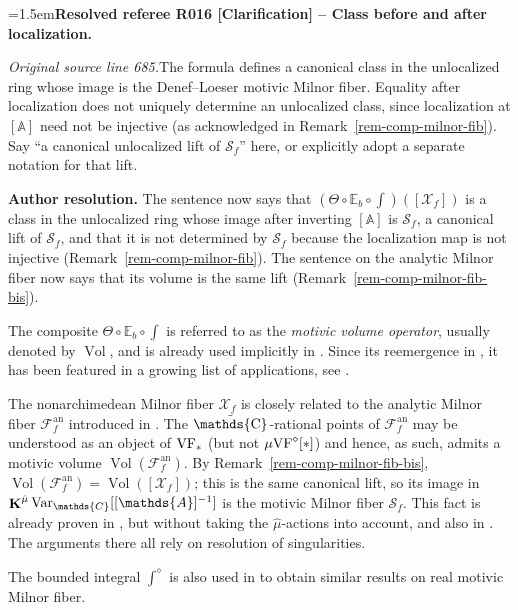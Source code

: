 \documentclass[12pt]{amsart}
\newcommand{\ResolvedRefereeRemark}[5]{%
  \par\medskip\begingroup\normalfont\small\color{gray}%
  \emergencystretch=1.5em\noindent\textbf{Resolved referee R#1 [#2] -- #3.}\par\nobreak\noindent #4\par
  \medskip\color{ResolutionGreen}\noindent\textbf{Author resolution.} #5\par
  \endgroup\medskip
}
\newcommand{\memph}[1]{{\color{magenta}\emph{#1}}}
\theoremstyle{plain}
\theoremstyle{definition}
\theoremstyle{remark}
\numberwithin{equation}{section}
\theoremstyle{plain}
\newcommand{\VF}{\textup{VF}}
\newcommand{\A}{\mathds{A}}
\newcommand{\C}{\mathds{C}}
\newcommand{\0}{\emptyset}
\newcommand{\mdl}[1]{\mathcal{#1}}  %
\newcommand{\bb}[1]{\mathbb{#1}}
\newcommand{\mgVF}{{\mu} {\VF}}
\DeclareMathOperator{\ggk}{\mathbf{K}}
\newcommand{\var}{\textup{Var}}
\DeclareMathOperator{\puC}{\tilde \C}
\DeclareMathOperator{\Vol}{Vol}
\newcommand{\gmv}{\ggk^{\hat \mu}\var_{\C}}
\begin{document}
\ResolvedRefereeRemark{016}{Clarification}{Class before and after localization}{%
\textit{Original source line 685.}\quad The formula defines a canonical class in the unlocalized ring whose image is the Denef--Loeser motivic Milnor fiber. Equality after localization does not uniquely determine an unlocalized class, since localization at $[\A]$ need not be injective (as acknowledged in Remark~\ref{rem-comp-milnor-fib}). Say ``a canonical unlocalized lift of $\mathscr S_f$'' here, or explicitly adopt a separate notation for that lift.
}{The sentence now says that $(\Theta \circ \bb E_b \circ \int)([\mdl X_f])$ is a class in the unlocalized ring whose image after inverting $[\A]$ is $\mathscr S_f$, a canonical lift of $\mathscr S_f$, and that it is not determined by $\mathscr S_f$ because the localization map is not injective (Remark~\ref{rem-comp-milnor-fib}). The sentence on the analytic Milnor fiber now says that its volume is the same lift (Remark~\ref{rem-comp-milnor-fib-bis}).}

The composite  $\Theta \circ \bb E_b \circ \int$ is referred to as the \memph{motivic volume operator}, usually denoted by $\Vol$, and is already used implicitly in \cite{hrushovski:kazhdan:integration:vf}. Since its reemergence in \cite{hru:loe:lef}, it has been featured in a growing list of applications, see \cite{thuong-int-conj, nicaise_ps_tropical, Nic:Pay:trop:fub, forey_virtual_2017, NS-deg-stab-rat}.

The nonarchimedean Milnor fiber $\mdl X_f$ is closely related to the analytic Milnor fiber $\mathcal{F}^{\mathrm{an}}_{f}$ introduced in \cite{nicaise:sebag:motivic:serre}. The $\puC$-rational points of $\mathcal{F}^{\mathrm{an}}_{f}$ may be understood as an object of  $\VF_*$ (but not $\mgVF^\diamond[*]$) and hence, as such, admits a motivic volume $\Vol(\mathcal{F}^{\mathrm{an}}_{f})$. By Remark~\ref{rem-comp-milnor-fib-bis}, $\Vol(\mathcal{F}^{\mathrm{an}}_{f}) = \Vol([\mdl X_f])$; this is the same canonical lift, so its image in $\gmv[[\A]^{-1}]$ is the motivic Milnor fiber $\mathscr S_{f}$. This fact is already proven  in \cite{nicaise_ps_tropical}, but without taking the $\hat \mu$-actions into account, and also in \cite{Nic:Pay:trop:fub, forey_virtual_2017}. The arguments there all rely on resolution of singularities.

The bounded integral $\int^\diamond$ is also used in \cite{FY:Mot-Int-Mil-Fib} to obtain similar results on real motivic Milnor fiber.
\end{document}
